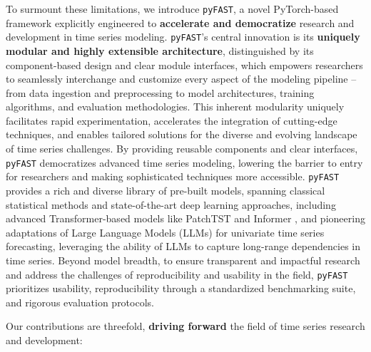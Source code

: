 \documentclass[twoside,11pt]{article}
\begin{document}
To surmount these limitations, we introduce \texttt{pyFAST}, a novel PyTorch-based framework explicitly engineered to \textbf{accelerate and democratize} research and development in time series modeling.  \texttt{pyFAST}'s central innovation is its \textbf{uniquely modular and highly extensible architecture}, distinguished by its component-based design and clear module interfaces, which empowers researchers to seamlessly interchange and customize every aspect of the modeling pipeline – from data ingestion and preprocessing to model architectures, training algorithms, and evaluation methodologies. This inherent modularity uniquely facilitates rapid experimentation, accelerates the integration of cutting-edge techniques, and enables tailored solutions for the diverse and evolving landscape of time series challenges. By providing reusable components and clear interfaces, \texttt{pyFAST} democratizes advanced time series modeling, lowering the barrier to entry for researchers and making sophisticated techniques more accessible. \texttt{pyFAST} provides a rich and diverse library of pre-built models, spanning classical statistical methods and state-of-the-art deep learning approaches, including advanced Transformer-based models like PatchTST \citep{Yuqietal2023} and Informer \citep{haoyietal2023}, and pioneering adaptations of Large Language Models (LLMs) for univariate time series forecasting, leveraging the ability of LLMs to capture long-range dependencies in time series. Beyond model breadth, to ensure transparent and impactful research and address the challenges of reproducibility and usability in the field, \texttt{pyFAST} prioritizes usability, reproducibility through a standardized benchmarking suite, and rigorous evaluation protocols.

Our contributions are threefold, \textbf{driving forward} the field of time series research and development:
\end{document}

